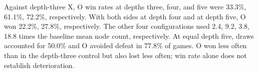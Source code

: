 Against depth-three X, O win rates at depths three, four, and five were 33.3\%, 61.1\%, 72.2\%, respectively. With both sides at depth four and at depth five, O won 22.2\%, 27.8\%, respectively. The other four configurations used 2.4, 9.2, 3.8, 18.8 times the baseline mean node count, respectively. At equal depth five, draws accounted for 50.0\% and O avoided defeat in 77.8\% of games. O won less often than in the depth-three control but also lost less often; win rate alone does not establish deterioration.
